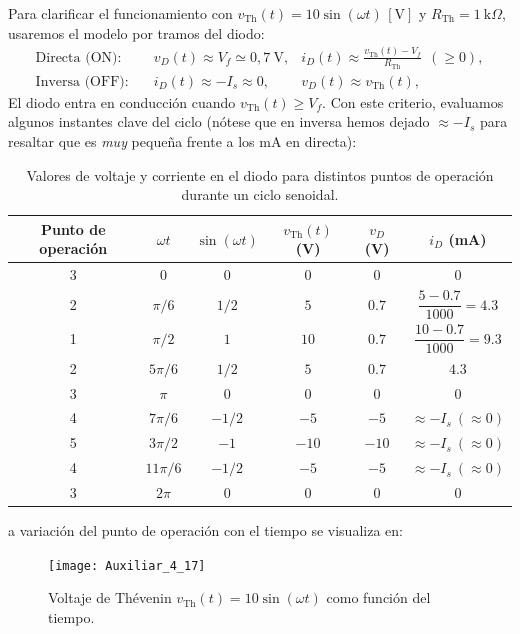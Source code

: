 \documentclass[
  11pt,
  letterpaper,
   addpoints,
   answers
  ]{exam}
\begin{document}
\begin{questions}
\begin{solution}
Para clarificar el funcionamiento con $v_{\text{Th}}(t)=10\sin(\omega t)\,[\text{V}]$ y $R_{\text{Th}}=1~\text{k}\Omega$, usaremos el modelo por tramos del diodo:
\begin{align}
\text{Directa (ON):}\quad &v_D(t)\approx V_f\simeq 0{,}7~\text{V}, & i_D(t)\approx \frac{v_{\text{Th}}(t)-V_f}{R_{\text{Th}}}\ \ (\ge 0),\\
\text{Inversa (OFF):}\quad &i_D(t)\approx -I_s\approx 0, & v_D(t)\approx v_{\text{Th}}(t),
\end{align}
El diodo entra en conducción cuando $v_{\text{Th}}(t)\ge V_f$. Con este criterio, evaluamos algunos instantes clave del ciclo (nótese que en inversa hemos dejado $\approx -I_s$ para resaltar que es \emph{muy} pequeña frente a los mA en directa):
\begin{table}[H]
  \centering
  \begin{tabular}{c c c c c c}
    \hline
    Punto de operación & $\omega t$ & $\sin(\omega t)$ & $v_{\text{Th}}(t)$ (V) & $v_D$ (V) & $i_D$ (mA) \\
    \hline
    3 & $0$ & $0$ & $0$ & $0$ & $0$ \\
    2 & $\pi/6$ & $1/2$ & $5$ & $0.7$ & $\dfrac{5-0.7}{1000}=4.3$ \\
    1 & $\pi/2$ & $1$ & $10$ & $0.7$ & $\dfrac{10-0.7}{1000}=9.3$ \\
    2 & $5\pi/6$ & $1/2$ & $5$ & $0.7$ & $4.3$ \\
    3 & $\pi$ & $0$ & $0$ & $0$ & $0$ \\
    4 & $7\pi/6$ & $-1/2$ & $-5$ & $-5$ & $\approx -I_s\ (\approx 0)$ \\
    5 & $3\pi/2$ & $-1$ & $-10$ & $-10$ & $\approx -I_s\ (\approx 0)$ \\
    4 & $11\pi/6$ & $-1/2$ & $-5$ & $-5$ & $\approx -I_s\ (\approx 0)$ \\
    3 & $2\pi$ & $0$ & $0$ & $0$ & $0$ \\
    \hline
  \end{tabular}
  \caption{Valores de voltaje y corriente en el diodo para distintos puntos de operación durante un ciclo senoidal.}
  \label{tab:diodo-operacion}
\end{table}
a variación del punto de operación con el tiempo se visualiza en:
\begin{figure}[H]
    \centering
    \texttt{[image: Auxiliar\_4\_17]}
    \caption{Voltaje de Thévenin $v_{\text{Th}}(t)=10\sin(\omega t)$ como función del tiempo.}
    \label{fig:voltaje-th}
\end{figure}


\end{solution}
\end{questions}
\end{document}
